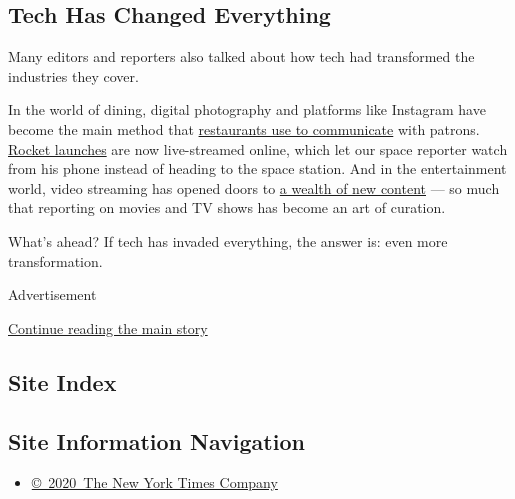 \hypertarget{tech-has-changed-everything}{%
\subsection{Tech Has Changed
Everything}\label{tech-has-changed-everything}}

Many editors and reporters also talked about how tech had transformed
the industries they cover.

In the world of dining, digital photography and platforms like Instagram
have become the main method that
\href{https://www.nytimes3xbfgragh.onion/2017/09/20/technology/personaltech/what-technology-pete-wells-uses.html}{restaurants
use to communicate} with patrons.
\href{https://www.nytimes3xbfgragh.onion/2017/11/22/technology/personaltech/rocket-launches-space-iphone.html}{Rocket
launches} are now live-streamed online, which let our space reporter
watch from his phone instead of heading to the space station. And in the
entertainment world, video streaming has opened doors to
\href{https://www.nytimes3xbfgragh.onion/2019/06/26/technology/personaltech/for-a-tv-editor-500-new-shows-a-year-require-a-fresh-script.html}{a
wealth of new content} --- so much that reporting on movies and TV shows
has become an art of curation.

What's ahead? If tech has invaded everything, the answer is: even more
transformation.

Advertisement

\protect\hyperlink{after-bottom}{Continue reading the main story}

\hypertarget{site-index}{%
\subsection{Site Index}\label{site-index}}

\hypertarget{site-information-navigation}{%
\subsection{Site Information
Navigation}\label{site-information-navigation}}

\begin{itemize}
\tightlist
\item
  \href{https://help.nytimes3xbfgragh.onion/hc/en-us/articles/115014792127-Copyright-notice}{©~2020~The
  New York Times Company}
\end{itemize}

